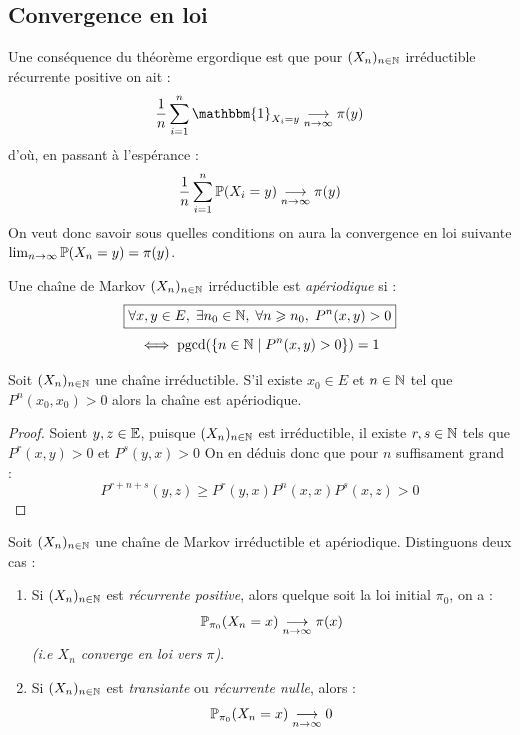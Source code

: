\subsection{Convergence en loi}

Une conséquence du théorème ergordique est que pour $(X_n)_{n \in \mathbb{N}}$ irréductible récurrente positive on ait : 
    $$ \frac{1}{n} \sum_{i=1}^{n} \mathbbm{1}_{X_i = y} \underset{n \to \infty}{\longrightarrow} \pi(y) $$ 
d'où, en passant à l'espérance : 
    \[ \frac{1}{n} \sum_{i=1}^{n} \mathbb{P}(X_i = y) \underset{n \to \infty}{\longrightarrow} \pi(y) \] 
On veut donc savoir sous quelles conditions on aura la convergence en loi suivante $ \lim_{n \to \infty} \mathbb{P}(X_n = y) = \pi(y)$. 

\begin{definition}[apériodicité]
    Une chaîne de Markov $(X_n)_{n \in \mathbb{N}}$ irréductible est \emph{apériodique} si : 
        \[ \boxed{\forall x, y \in E, \; \exists n_0 \in \mathbb{N}, \; \forall n \geqslant n_0, \; P^n(x,y) > 0}  \] 
        \[ \iff \text{pgcd}( \{ n \in \mathbb{N} \mid P^n(x,y) > 0\}) = 1 \] 
\end{definition}

\begin{lemma}
    Soit $(X_n)_{n \in \mathbb{N}}$ une chaîne irréductible. S'il existe $x_0 \in E$ et $ n \in \mathbb{N}$ tel que
    $P^n(x_0, x_0) > 0$ alors la chaîne est apériodique.
\end{lemma}

\begin{proof}
    Soient $y,z \in \mathbb{E}$, puisque $(X_n)_{n \in \mathbb{N}}$ est irréductible, il existe $r,s \in \mathbb{N}$ tels que 
    $ P^r(x,y) > 0$ et $P^s(y,x) > 0$ On en déduis donc que pour $n$ suffisament grand : 
        \[ P^{r+n+s}(y,z) \geqslant P^r(y,x) P^n(x,x) P^s(x,z) > 0 \] 
\end{proof}

\begin{theorem}
    Soit $(X_n)_{n \in \mathbb{N}}$ une chaîne de Markov irréductible et apériodique. Distinguons deux cas : 
    \begin{enumerate}
        \item Si $(X_n)_{n \in \mathbb{N}}$ est \emph{récurrente positive}, alors quelque soit la loi initial $ \pi_0$, on a : 
            \[ \mathbb{P}_{ \pi_0}(X_n = x) \underset{n \to \infty}{\longrightarrow} \pi(x) \] 
        \emph{(i.e $X_n$ converge en loi vers $ \pi$)}. 
        \item Si $(X_n)_{n \in \mathbb{N}}$ est \emph{transiante} ou \emph{récurrente nulle}, alors : 
            \[ \mathbb{P}_{ \pi_0}(X_n = x) \underset{n \to \infty}{\longrightarrow} 0 \] 
    \end{enumerate}
\end{theorem}


